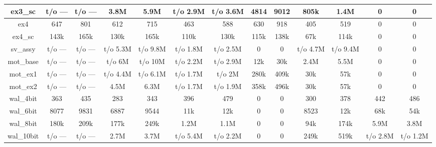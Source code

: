 \begin{sidewaystable}[ph!]
\begin{tabular}{|c|c|c|c|c|c|c|c|c|c|c|c|c|}
ex3\_sc        & t/o ---        & t/o ---       & 3.8M         & 5.9M         & t/o 2.9M    & t/o 3.6M    & 4814           & 9012          & 805k          & 1.4M         & 0              & 0              \\ \hline
ex4         & 647            & 801           & 612             & 715             & 463            & 588            & 630            & 918           & 405             & 519             & 0              & 0              \\ \hline
ex4\_sc      & 143k         & 165k        & 130k          & 165k          & 110k         & 130k         & 115k         & 138k        & 67k           & 114k          & 0              & 0              \\ \hline
sv\_assy              & t/o ---        & t/o ---       & t/o 5.3M     & t/o 9.8M     & t/o 1.8M    & t/o 2.5M    & 0              & 0             & t/o 4.7M     & t/o 9.4M     & 0              & 0              \\ \hline
mot\_base   & t/o ---        & t/o ---       & t/o 6M     & t/o 10M    & t/o 2.2M    & t/o 2.9M    & 12k          & 30k         & 2.4M         & 5.5M         & 0              & 0              \\ \hline
mot\_ex1 & t/o ---        & t/o ---       & t/o 4.4M     & t/o 6.1M     & t/o 1.7M    & t/o 2M    & 280k         & 409k        & 30k           & 57k           & 0              & 0              \\ \hline
mot\_ex2 & t/o ---        & t/o ---       & 4.5M         & 6.3M         & t/o 1.7M    & t/o 1.9M    & 358k         & 496k        & 30k           & 57k           & 0              & 0              \\ \hline \hline
wal\_4bit  & 363            & 435           & 283             & 343             & 396            & 479            & 0              & 0             & 300             & 378             & 442            & 486            \\ \hline
wal\_6bit  & 8077           & 9831          & 6887            & 9544            & 11k          & 12k          & 0              & 0             & 8523            & 12k           & 68k          & 54k          \\ \hline
wal\_8bit  & 180k         & 209k        & 177k          & 249k          & 1.2M        & 1.1M        & 0              & 0             & 94k           & 174k          & 5.9M        & 3.8M        \\ \hline
wal\_10bit & t/o ---        & t/o ---       & 2.7M         & 3.7M         & t/o 5.4M    & t/o 2.2M    & 0              & 0             & 249k          & 519k          & t/o 2.8M    & t/o 1.2M    \\ \hline

\end{tabular}
\end{sidewaystable}
